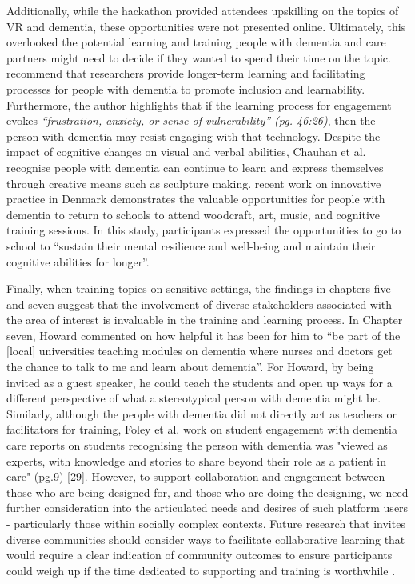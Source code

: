 Additionally, while the hackathon provided attendees upskilling on the topics of VR and dementia, these opportunities were not presented online. Ultimately, this overlooked the potential learning and training people with dementia and care partners might need to decide if they wanted to spend their time on the topic. \cite{hwang2020exploring} recommend that researchers provide longer-term learning and facilitating processes for people with dementia to promote inclusion and learnability. Furthermore, the author highlights that if the learning process for engagement evokes \textit{``frustration, anxiety, or sense of vulnerability'' (pg. 46:26)}, then the person with dementia may resist engaging with that technology. Despite the impact of cognitive changes on visual and verbal abilities, Chauhan et al. recognise people with dementia can continue to learn and express themselves through creative means such as sculpture making. \cite{ward2020going}  recent work on innovative practice in Denmark demonstrates the valuable opportunities for people with dementia to return to schools to attend woodcraft, art, music, and cognitive training sessions. In this study, participants expressed the opportunities to go to school to ``sustain their mental resilience and well-being and maintain their cognitive abilities for longer''.

Finally, when training topics on sensitive settings, the findings in chapters five and seven suggest that the involvement of diverse stakeholders associated with the area of interest is invaluable in the training and learning process. In Chapter seven, Howard commented on how helpful it has been for him to ``be part of the [local] universities teaching modules on dementia where nurses and doctors get the chance to talk to me and learn about dementia''. For Howard, by being invited as a guest speaker, he could teach the students and open up ways for a different perspective of what a stereotypical person with dementia might be. Similarly, although the people with dementia did not directly act as teachers or facilitators for training, Foley et al. work on student engagement with dementia care reports on students recognising the person with dementia was "viewed as experts, with knowledge and stories to share beyond their role as a patient in care" (pg.9) [29]. However, to support collaboration and engagement between those who are being designed for, and those who are doing the designing, we need further consideration into the articulated needs and desires of such platform users - particularly those within socially complex contexts. Future research that invites diverse communities should consider ways to facilitate collaborative learning that would require a clear indication of community outcomes to ensure participants could weigh up if the time dedicated to supporting and training is worthwhile \citep{hayes2020inclusive}.

